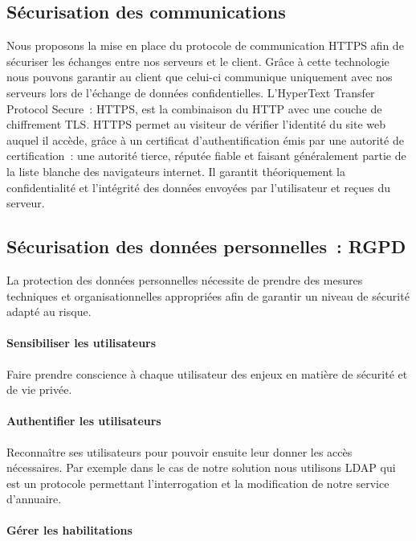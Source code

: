 \subsection{Sécurisation des communications}

Nous proposons la mise en place du protocole de communication HTTPS afin
de sécuriser les échanges entre nos serveurs et le client. Grâce à cette
technologie nous pouvons garantir au client que celui-ci communique
uniquement avec nos serveurs lors de l'échange de données
confidentielles. L'HyperText Transfer Protocol Secure~: HTTPS, est la
combinaison du HTTP avec une couche de chiffrement TLS. HTTPS permet au
visiteur de vérifier l'identité du site web auquel il accède, grâce à un
certificat d'authentification émis par une autorité de certification~:
une autorité tierce, réputée fiable et faisant généralement partie de la
liste blanche des navigateurs internet. Il garantit théoriquement la
confidentialité et l'intégrité des données envoyées par l'utilisateur et
reçues du serveur.

\subsection{Sécurisation des données personnelles~: RGPD}

La protection des données personnelles nécessite de prendre des mesures
techniques et organisationnelles appropriées afin de garantir un niveau
de sécurité adapté au risque.

\paragraph{Sensibiliser les utilisateurs}

Faire prendre conscience à chaque utilisateur des enjeux en matière de
sécurité et de vie privée.

\paragraph{Authentifier les utilisateurs}

Reconnaître ses utilisateurs pour pouvoir ensuite leur donner les accès
nécessaires. Par exemple dans le cas de notre solution nous utilisons
LDAP qui est un protocole permettant l'interrogation et la modification
de notre service d'annuaire.

\paragraph{Gérer les habilitations}

